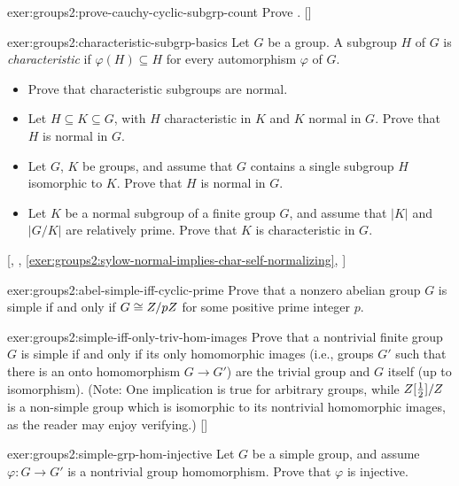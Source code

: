 \begin{exer}{}{exer:groups2:prove-cauchy-cyclic-subgrp-count}
  \exerused{} Prove . []
\end{exer}
\begin{exer}{}{exer:groups2:characteristic-subgrp-basics}
  \exerused{} Let $G$ be a group. A subgroup $H$ of $G$ is
  \emph{characteristic} if $\varphi(H) \subseteq H$ for every
  automorphism $\varphi$ of $G$.
  \begin{itemize}
  \item Prove that characteristic subgroups are normal.
  \item Let $H \subseteq K \subseteq G$, with $H$ characteristic in
    $K$ and $K$ normal in $G$. Prove that $H$ is normal in $G$.
  \item Let $G$, $K$ be groups, and assume that $G$ contains a single
    subgroup $H$ isomorphic to $K$. Prove that $H$ is normal in $G$.
  \item Let $K$ be a normal subgroup of a finite group $G$, and assume
    that $|K|$ and $|G/K|$ are relatively prime. Prove that $K$ is
    characteristic in $G$.
  \end{itemize} [, ,
  \ref{exer:groups2:sylow-normal-implies-char-self-normalizing},
  ]
\end{exer}
\begin{exer}{}{exer:groups2:abel-simple-iff-cyclic-prime}
  Prove that a nonzero abelian group $G$ is simple if and only if
  $G \cong Z/pZ$ for some positive prime integer $p$.
\end{exer}
\begin{exer}{}{exer:groups2:simple-iff-only-triv-hom-images}
  \exerused{} Prove that a nontrivial finite group $G$ is simple if
  and only if its only homomorphic images (i.e., groups $G'$ such that
  there is an onto homomorphism $G \to G'$) are the trivial group and
  $G$ itself (up to isomorphism). (Note: One implication is true for
  arbitrary groups, while $Z[\frac{1}{2}]/Z$ is a non-simple group
  which is isomorphic to its nontrivial homomorphic images, as the
  reader may enjoy
  verifying.) []
\end{exer}
\begin{exer}{}{exer:groups2:simple-grp-hom-injective}
  Let $G$ be a simple group, and assume $\varphi : G \to G'$ is a
  nontrivial group homomorphism. Prove that $\varphi$ is injective.
\end{exer}
